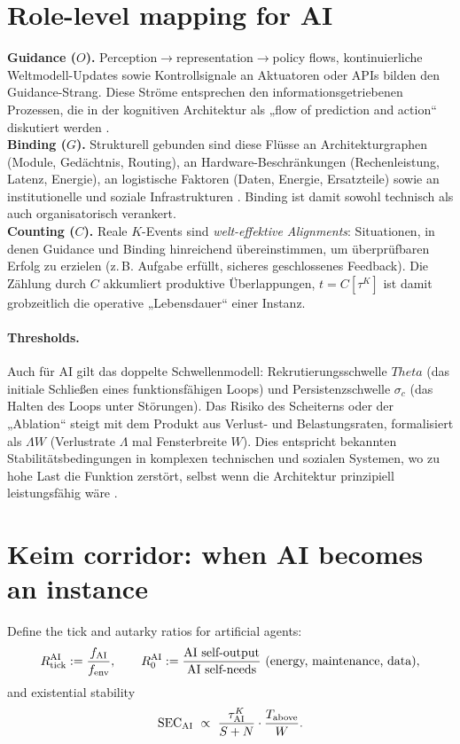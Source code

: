 \documentclass[12pt,a4paper,oneside]{scrreprt}
\def\Theta{Theta}%
\begin{document}
\section{Role-level mapping for AI}\label{sec:ai-mapping}
\textbf{Guidance ($O$).} Perception$\to$representation$\to$policy flows, kontinuierliche Weltmodell-Updates sowie Kontrollsignale an Aktuatoren oder APIs bilden den Guidance-Strang. Diese Ströme entsprechen den informationsgetriebenen Prozessen, die in der kognitiven Architektur als „flow of prediction and action“ diskutiert werden \cite{friston2010free}. \\

\textbf{Binding ($G$).} Strukturell gebunden sind diese Flüsse an Architekturgraphen (Module, Gedächtnis, Routing), an Hardware-Beschränkungen (Rechenleistung, Latenz, Energie), an logistische Faktoren (Daten, Energie, Ersatzteile) sowie an institutionelle und soziale Infrastrukturen \cite{brooks1991intelligence,russell2019human}. Binding ist damit sowohl technisch als auch organisatorisch verankert. \\

\textbf{Counting ($C$).} Reale $K$-Events sind \emph{welt-effektive Alignments}: Situationen, in denen Guidance und Binding hinreichend übereinstimmen, um überprüfbaren Erfolg zu erzielen (z.\,B. Aufgabe erfüllt, sicheres geschlossenes Feedback). Die Zählung durch $C$ akkumliert produktive Überlappungen, $t=C[\tau^K]$ ist damit grobzeitlich die operative „Lebensdauer“ einer Instanz. \\

\paragraph{Thresholds.}
Auch für AI gilt das doppelte Schwellenmodell: Rekrutierungsschwelle $\Theta$ (das initiale Schließen eines funktionsfähigen Loops) und Persistenzschwelle $\sigma_c$ (das Halten des Loops unter Störungen). 
Das Risiko des Scheiterns oder der „Ablation“ steigt mit dem Produkt aus Verlust- und Belastungsraten, formalisiert als $\Lambda W$ (Verlustrate $\Lambda$ mal Fensterbreite $W$). 
Dies entspricht bekannten Stabilitätsbedingungen in komplexen technischen und sozialen Systemen, wo zu hohe Last die Funktion zerstört, selbst wenn die Architektur prinzipiell leistungsfähig wäre \cite{bostrom2014superintelligence,goertzel2014artificial}.

\section{Keim corridor: when AI becomes an instance}\label{sec:ai-keim-corridor}
Define the tick and autarky ratios for artificial agents:
\[
R_{\rm tick}^{\rm AI}:=\frac{f_{\rm AI}}{f_{\rm env}},\qquad 
R_0^{\rm AI}:=\frac{\text{AI self-output}}{\text{AI self-needs}}\ (\text{energy, maintenance, data}),
\]
and existential stability
\[
\mathrm{SEC}_{\rm AI}\ \propto\ \frac{\tau^K_{\rm AI}}{S+N}\cdot\frac{T_{\rm above}}{W}.
\]
\end{document}
